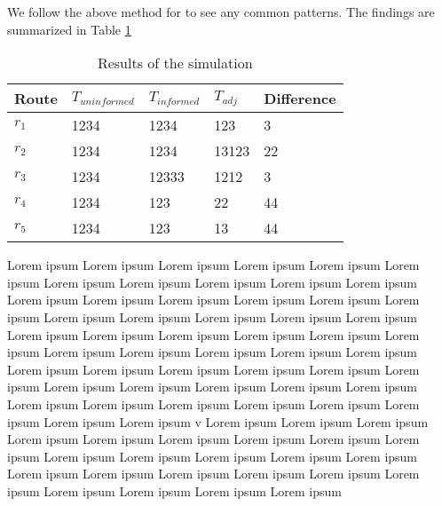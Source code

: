 We follow the above method for  to see any common patterns. The findings are summarized in Table \ref{tab:eval-results}
\begin{table}[]
\centering
\begin{tabular}{lllll}
\textbf{Route} & \textbf{$T_{uninformed}$} & \textbf{$T_{informed}$} & \textbf{$T_{adj}$} & \textbf{Difference} \\ \hline
$r_1$          & 1234                      & 1234                    & 123                & 3                   \\
$r_2$          & 1234                      & 1234                    & 13123              & 22                  \\
$r_3$          & 1234                      & 12333                   & 1212               & 3                   \\
$r_4$          & 1234                      & 123                     & 22                 & 44                  \\
$r_5$          & 1234                      & 123                     & 13                 & 44                 
\end{tabular}
\caption{Results of the simulation}
\label{tab:eval-results}
\end{table}
Lorem ipsum Lorem ipsum Lorem ipsum Lorem ipsum Lorem ipsum Lorem ipsum Lorem ipsum Lorem ipsum Lorem ipsum Lorem ipsum Lorem ipsum Lorem ipsum Lorem ipsum Lorem ipsum Lorem ipsum Lorem ipsum Lorem ipsum Lorem ipsum Lorem ipsum Lorem ipsum Lorem ipsum Lorem ipsum Lorem ipsum Lorem ipsum Lorem ipsum Lorem ipsum Lorem ipsum Lorem ipsum Lorem ipsum Lorem ipsum Lorem ipsum Lorem ipsum Lorem ipsum Lorem ipsum Lorem ipsum Lorem ipsum Lorem ipsum Lorem ipsum Lorem ipsum Lorem ipsum Lorem ipsum Lorem ipsum Lorem ipsum Lorem ipsum Lorem ipsum Lorem ipsum Lorem ipsum Lorem ipsum Lorem ipsum Lorem ipsum Lorem ipsum Lorem ipsum v
Lorem ipsum Lorem ipsum Lorem ipsum Lorem ipsum Lorem ipsum Lorem ipsum Lorem ipsum Lorem ipsum Lorem ipsum Lorem ipsum Lorem ipsum Lorem ipsum Lorem ipsum Lorem ipsum Lorem ipsum Lorem ipsum Lorem ipsum Lorem ipsum Lorem ipsum Lorem ipsum Lorem ipsum Lorem ipsum Lorem ipsum Lorem ipsum 